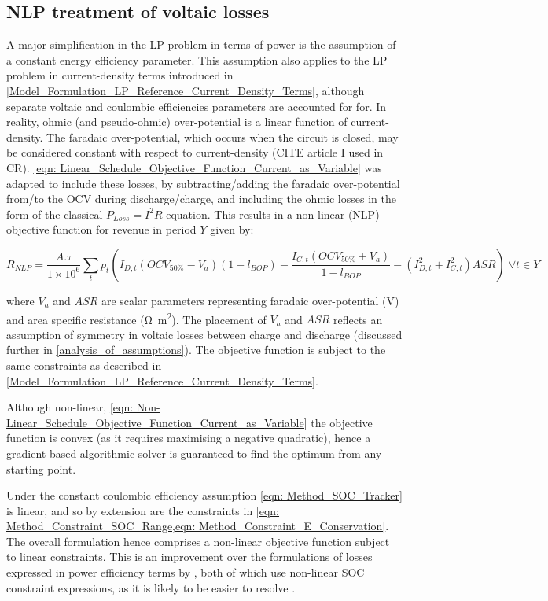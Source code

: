 \documentclass[preprint,3p,review,authoryear,10pt]{elsarticle}
\begin{document}
\subsection{NLP treatment of voltaic losses}
\label{Model_Formulation_NLP_treatment_voltaic_losses}
A major simplification in the LP problem in terms of power is the assumption of a constant energy efficiency parameter. This assumption also applies to the LP problem in current-density terms introduced in \cref{Model_Formulation_LP_Reference_Current_Density_Terms}, although separate voltaic and coulombic efficiencies parameters are accounted for for. In reality, ohmic (and pseudo-ohmic) over-potential is a linear function of current-density. The faradaic over-potential, which occurs when the circuit is closed, may be considered constant with respect to current-density (CITE article I used in CR). \cref{eqn: Linear_Schedule_Objective_Function_Current_as_Variable} was adapted to include these losses, by subtracting/adding the faradaic over-potential from/to the OCV during discharge/charge, and including the ohmic losses in the form of the classical $P_{Loss} = I^2R$ equation. This results in a non-linear (NLP) objective function for revenue in period $Y$ given by:

\begin{equation}
\label{eqn: Non-Linear_Schedule_Objective_Function_Current_as_Variable}
R_{NLP} = \frac{A.\tau}{1\times 10^{6}}\sum_{t}p_{t}(I_{D, t}(OCV_{50\%} - V_a)(1-l_{BOP}) - \frac{I_{C, t}(OCV_{50\%} + V_a)}{1-l_{BOP}} - (I_{D,t}^{2} + I_{C,t}^{2})ASR) \; \forall t \in Y
\end{equation}


where $V_a$ and $ASR$ are scalar parameters representing faradaic over-potential (\si{\volt}) and area specific resistance (\si{\ohm\square\meter}). The placement of $V_a$ and $ASR$ reflects an assumption of symmetry in voltaic losses between charge and discharge (discussed further in \cref{analysis_of_assumptions}). The objective function is subject to the same constraints as described in \cref{Model_Formulation_LP_Reference_Current_Density_Terms}.

Although non-linear, \cref{eqn: Non-Linear_Schedule_Objective_Function_Current_as_Variable} the objective function is convex (as it requires maximising a negative quadratic), hence a gradient based algorithmic solver is guaranteed to find the optimum from any starting point. 


Under the constant coulombic efficiency assumption \cref{eqn: Method_SOC_Tracker} is linear, and so by extension are the constraints in \cref{eqn: Method_Constraint_SOC_Range,eqn: Method_Constraint_E_Conservation}.  The overall formulation hence comprises a non-linear objective function subject to linear constraints. This is an improvement over the formulations of losses expressed in power efficiency terms by \cite{Nguyen2015,Sarker2017}, both of which use non-linear SOC constraint expressions, as it is likely to be easier to resolve \cite{Hart2017}.
\end{document}
